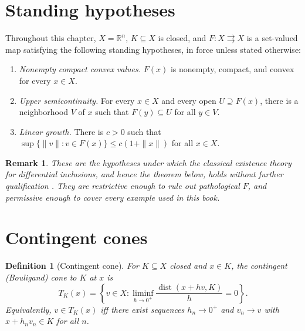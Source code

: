 \documentclass[11pt]{report}
\newtheorem{definition}{Definition}[chapter]
\newtheorem{remark}{Remark}[chapter]
\begin{document}
\section*{Standing hypotheses}

Throughout this chapter, $X = \mathbb{R}^n$, $K \subseteq X$ is closed,
and $F : X \rightrightarrows X$ is a set-valued map satisfying the
following standing hypotheses, in force unless stated otherwise:

\begin{enumerate}[label=(H\arabic*)]
\item \emph{Nonempty compact convex values.} $F(x)$ is nonempty,
compact, and convex for every $x \in X$.
\item \emph{Upper semicontinuity.} For every $x \in X$ and every open
$U \supseteq F(x)$, there is a neighborhood $V$ of $x$ such that
$F(y) \subseteq U$ for all $y \in V$.
\item \emph{Linear growth.} There is $c > 0$ such that
$\sup\{\|v\| : v \in F(x)\} \leq c(1 + \|x\|)$ for all $x \in X$.
\end{enumerate}

\begin{remark}
These are the hypotheses under which the classical existence theory for
differential inclusions, and hence the theorem below, holds without
further qualification \cite{aubincellina1984}. They are restrictive
enough to rule out pathological $F$, and permissive enough to cover
every example used in this book.
\end{remark}

\section*{Contingent cones}

\begin{definition}[Contingent cone]
For $K \subseteq X$ closed and $x \in K$, the contingent (Bouligand)
cone to $K$ at $x$ is
\[
T_K(x) = \left\{ v \in X : \liminf_{h \to 0^+} \frac{\operatorname{dist}(x + hv, K)}{h} = 0 \right\}.
\]
Equivalently, $v \in T_K(x)$ iff there exist sequences $h_n \to 0^+$ and
$v_n \to v$ with $x + h_n v_n \in K$ for all $n$.
\end{definition}
\end{document}
